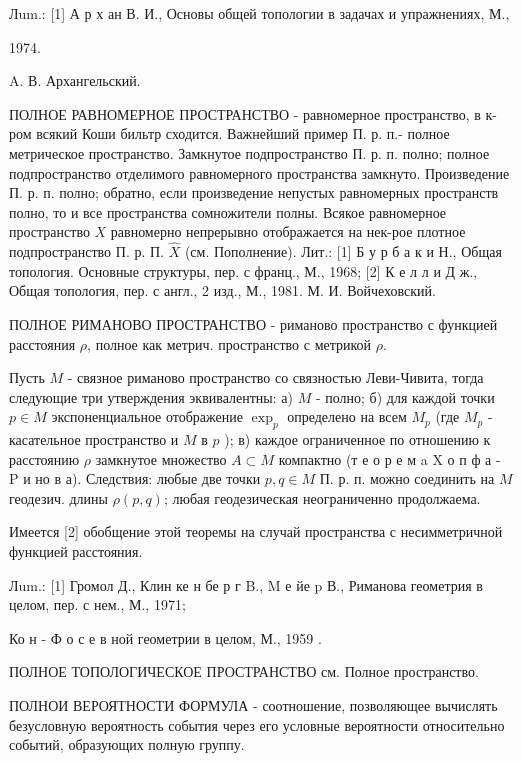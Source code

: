 \documentclass[10pt]{article}
\begin{document}
Лum.: [1] А р х ан В. И., Основы общей топологии в задачах и упражнениях, М.,

1974.

A. В. Архангельский.



ПОЛНОЕ РАВНОМЕРНОЕ ПРОСТРАНСТВО - равномерное пространство, в к-ром всякий Коши бильтр сходится. Важнейший пример П. р. п.- полное метрическое пространство. Замкнутое подпространство П. р. п. полно; полное подпространство отделимого равномерного пространства замкнуто. Произведение П. р. п. полно; обратно, если произведение непустых равномерных пространств полно, то и все пространства сомножители полны. Всякое равномерное пространство $X$ равномерно непрерывно отображается на нек-рое плотное подпространство П. р. П. $\hat{X}$ (см. Пополнение). Лит.: [1] Б у р б а к и Н., Общая топология. Основные структуры, пер. с франц., М., 1968; [2] К е л л и Д ж., Общая топология, пер. с англ., 2 изд., М., 1981. М. И. Войчеховский.



ПОЛНОЕ РИМАНОВО ПРОСТРАНСТВО - риманово пространство с функцией расстояния $\rho$, полное как метрич. пространство с метрикой $\rho$.



Пусть $M$ - связное риманово пространство со связностью Леви-Чивита, тогда следующие три утверждения эквивалентны: а) $M$ - полно; б) для каждой точки $p \in M$ экспоненциальное отображение $\exp _{p}$ определено на всем $M_{p}$ (где $M_{p}$ - касательное пространство и $M$ в $p$ ); в) каждое ограниченное по отношению к расстоянию $\rho$ замкнутое множество $A \subset M$ компактно (т е о р е м a $\mathrm{X}$ о п ф а - $\mathrm{P}$ и но в а). Следствия: любые две точки $p, q \in M$ П. р. п. можно соединить на $M$ геодезич. длины $\rho(p, q)$; любая геодезическая неограниченно продолжаема.



Имеется [2] обобщение этой теоремы на случай пространства с несимметричной функцией расстояния.



Лum.: [1] Громол Д., Клин ке н бе р г B., M е йе p В., Риманова геометрия в целом, пер. с нем., М., 1971;

Ко н - Ф о с е в ной геометрии в целом, М., 1959 .



ПОЛНОЕ ТОПОЛОГИЧЕСКОЕ ПРОСТРАНСТВО см. Полное пространство.



ПОЛНОИ ВЕРОЯТНОСТИ ФОРМУЛА - соотношение, позволяющее вычислять безусловную вероятность события через его условные вероятности относительно событий, образующих полную группу.
\end{document}
